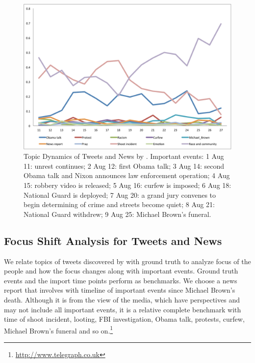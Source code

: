 \begin{figure}[htpb]
\includegraphics[width=\linewidth]{2016_icwsm_topicDynamic/figures/Legend_revised_cut.pdf}
\caption{Topic Dynamics of Tweets and News by \stlda. Important events: \textcircled{\small{1}} Aug 11: unrest continues; \textcircled{\small{2}} Aug 12: first Obama talk; \textcircled{\small{3}} Aug 14: second Obama talk and Nixon announces law enforcement operation; \textcircled{\small{4}} Aug 15: robbery video is released; \textcircled{\small{5}} Aug 16: curfew is imposed; \textcircled{\small{6}} Aug 18: National Guard is deployed; \textcircled{\small{7}} Aug 20: a grand jury convenes to begin determining of crime and streets become quiet; \textcircled{\small{8}} Aug 21: National Guard withdrew; \textcircled{\small{9}} Aug 25: Michael Brown's funeral.}\label{fig:topic_dynamics}
\end{figure}

\subsection{Focus Shift Analysis for Tweets and News}
\label{subsec:tweet_topic}
We relate topics of tweets discovered by \stlda with ground truth to analyze focus of the people and how the focus changes along with important events. Ground truth events and the import time points perform as benchmarks. We choose a news report that involves with timeline of important events since Michael Brown's death. Although it is from the view of the media, which have perspectives and may not include all important events, it is a relative complete benchmark with time of shoot incident, looting, FBI investigation, Obama talk, protests, curfew, Michael Brown's funeral and so on.\footnote{\url{http://www.telegraph.co.uk}}

